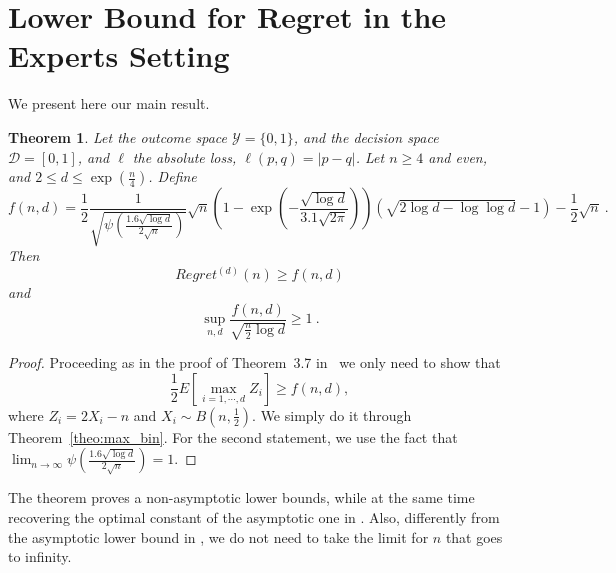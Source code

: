 \documentclass{article}
\newtheorem{theorem}{Theorem}
\begin{document}
\section{Lower Bound for Regret in the Experts Setting}
\label{section:experts}

We present here our main result.

\begin{theorem}
Let the outcome space $\mathcal{Y}=\{0,1\}$, and the decision space $\mathcal{D}=[0,1]$, and $\ell$ the absolute loss, $\ell(p,q)=|p-q|$. Let $n\geq4$ and even, and $2\leq d \leq \exp(\frac{n}{4})$.
Define
\[
f(n,d)=\frac{1}{2}\frac{1}{\sqrt{\psi\left(\frac{1.6 \sqrt{\log d}}{2 \sqrt{n}}\right)}}\sqrt{n}\left(1 - \exp\left(-\frac{\sqrt{\log d}}{3.1 \sqrt{2\pi}}\right)\right) \left(\sqrt{2 \log d -\log \log d}-1\right) -\frac{1}{2}\sqrt{n}~.
\]
Then
\[
Regret^{(d)}(n)\geq f(n,d)
\]
and
\[
\sup_{n,d} \frac{f(n,d)}{\sqrt{\frac{n}{2} \log d}} \geq 1~.
\]
\end{theorem}
%
\begin{proof}
Proceeding as in the proof of Theorem~3.7 in~\citep{Cesa-BianchiL06} we only need to show that
\[
\frac{1}{2} E\left[ \max_{i=1,\cdots,d} Z_i\right] \geq f(n,d),
\]
where $Z_i= 2 X_i - n$ and $X_i \sim B(n, \frac{1}{2})$. We simply do it through Theorem~\ref{theo:max_bin}.
For the second statement, we use the fact that $\lim_{n\rightarrow\infty} \psi\left(\frac{1.6 \sqrt{\log d}}{2 \sqrt{n}}\right) = 1$.
\end{proof}

The theorem proves a non-asymptotic lower bounds, while at the same time recovering the optimal constant of the asymptotic one in \citet{Cesa-BianchiL06}. Also, differently from the asymptotic lower bound in \citet{Cesa-BianchiL06}, we do not need to take the limit for $n$ that goes to infinity.




\appendix
\end{document}
